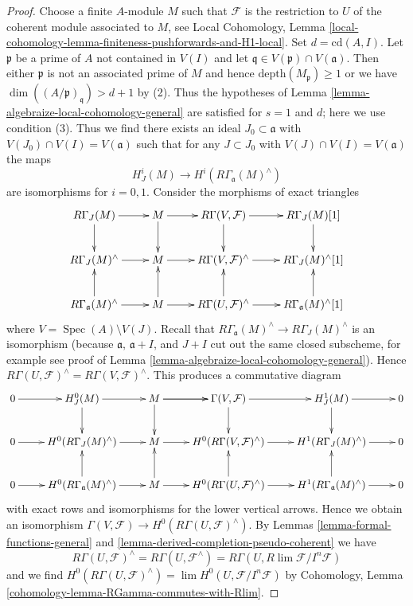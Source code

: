 \documentclass{stacks-project}
\theoremstyle{plain}
\theoremstyle{definition}
\theoremstyle{remark}
\numberwithin{equation}{subsection}
\def\lim{\mathop{\mathrm{lim}}\nolimits}
\def\Spec{\mathop{\mathrm{Spec}}}
\begin{document}
\begin{proof}
Choose a finite $A$-module $M$ such that $\mathcal{F}$ is the restriction
to $U$ of the coherent module associated to $M$, see Local Cohomology,
Lemma \ref{local-cohomology-lemma-finiteness-pushforwards-and-H1-local}.
Set $d = \text{cd}(A, I)$.
Let $\mathfrak p$ be a prime of $A$ not contained in $V(I)$
and let $\mathfrak q \in V(\mathfrak p) \cap V(\mathfrak a)$.
Then either $\mathfrak p$ is not an associated prime of $M$
and hence $\text{depth}(M_\mathfrak p) \geq 1$
or we have $\dim((A/\mathfrak p)_\mathfrak q) > d + 1$ by (2).
Thus the hypotheses of
Lemma \ref{lemma-algebraize-local-cohomology-general}
are satisfied for $s = 1$ and $d$; here we use condition (3).
Thus we find there exists an ideal
$J_0 \subset \mathfrak a$ with $V(J_0) \cap V(I) = V(\mathfrak a)$
such that for any $J \subset J_0$ with $V(J) \cap V(I) = V(\mathfrak a)$
the maps
$$
H^i_J(M) \longrightarrow H^i(R\Gamma_\mathfrak a(M)^\wedge)
$$
are isomorphisms for $i = 0, 1$. Consider the morphisms of
exact triangles
$$
\xymatrix{
R\Gamma_J(M)  \ar[d] \ar[r] &
M \ar[r] \ar[d] &
R\Gamma(V, \mathcal{F}) \ar[d] \ar[r] &
R\Gamma_J(M)[1]  \ar[d] \\
R\Gamma_J(M)^\wedge \ar[r] &
M \ar[r] &
R\Gamma(V, \mathcal{F})^\wedge \ar[r] &
R\Gamma_J(M)^\wedge[1] \\
R\Gamma_\mathfrak a(M)^\wedge \ar[r] \ar[u] &
M \ar[r] \ar[u] &
R\Gamma(U, \mathcal{F})^\wedge \ar[r] \ar[u] &
R\Gamma_\mathfrak a(M)^\wedge[1] \ar[u]
}
$$
where $V = \Spec(A) \setminus V(J)$. Recall that
$R\Gamma_\mathfrak a(M)^\wedge \to R\Gamma_J(M)^\wedge$
is an isomorphism (because $\mathfrak a$, $\mathfrak a + I$, and $J + I$
cut out the same closed subscheme, for example
see proof of Lemma \ref{lemma-algebraize-local-cohomology-general}).
Hence
$R\Gamma(U, \mathcal{F})^\wedge = R\Gamma(V, \mathcal{F})^\wedge$.
This produces a commutative diagram
$$
\xymatrix{
0 \ar[r] &
H^0_J(M) \ar[r] \ar[d] &
M \ar[r] \ar[d] \ar[r] &
\Gamma(V, \mathcal{F}) \ar[d] \ar[r] &
H^1_J(M) \ar[d] \ar[r] &
0 \\
0 \ar[r] &
H^0(R\Gamma_J(M)^\wedge) \ar[r] &
M \ar[r] &
H^0(R\Gamma(V, \mathcal{F})^\wedge) \ar[r] &
H^1(R\Gamma_J(M)^\wedge) \ar[r] &
0 \\
0 \ar[r] &
H^0(R\Gamma_\mathfrak a(M)^\wedge) \ar[r] \ar[u] &
M \ar[r] \ar[u] &
H^0(R\Gamma(U, \mathcal{F})^\wedge) \ar[r] \ar[u] &
H^1(R\Gamma_\mathfrak a(M)^\wedge) \ar[r] \ar[u] &
0
}
$$
with exact rows and isomorphisms for the lower vertical arrows. Hence
we obtain an isomorphism
$\Gamma(V, \mathcal{F}) \to H^0(R\Gamma(U, \mathcal{F})^\wedge)$.
By Lemmas \ref{lemma-formal-functions-general}
and \ref{lemma-derived-completion-pseudo-coherent} we have
$$
R\Gamma(U, \mathcal{F})^\wedge =
R\Gamma(U, \mathcal{F}^\wedge) =
R\Gamma(U, R\lim \mathcal{F}/I^n\mathcal{F})
$$
and we find $H^0(R\Gamma(U, \mathcal{F})^\wedge) =
\lim H^0(U, \mathcal{F}/I^n\mathcal{F})$ by
Cohomology, Lemma \ref{cohomology-lemma-RGamma-commutes-with-Rlim}.
\end{proof}
\end{document}
